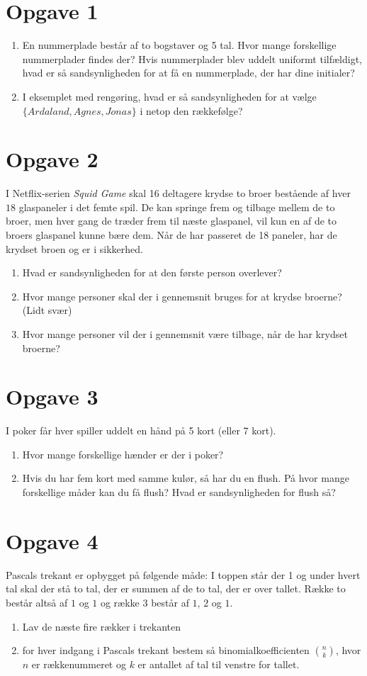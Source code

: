 \section*{Opgave 1}
\begin{enumerate}[label=\roman*)]
\item En nummerplade består af to bogstaver og 5 tal. Hvor mange forskellige nummerplader findes der? Hvis nummerplader blev uddelt uniformt tilfældigt, hvad er så sandsynligheden for at få en nummerplade, der har dine initialer?
\item I eksemplet med rengøring, hvad er så sandsynligheden for at vælge $\{Ardaland, Agnes,Jonas\}$ i netop den rækkefølge?
\end{enumerate}
\section*{Opgave 2}
I Netflix-serien \textit{Squid Game} skal 16 deltagere krydse to broer bestående af hver $18$ glaspaneler i det femte spil. De kan springe frem og tilbage mellem de to broer, men hver gang de træder frem til næste glaspanel, vil kun en af de to broers glaspanel kunne bære dem. Når de har passeret de 18 paneler, har de krydset broen og er i sikkerhed.
\begin{enumerate}[label=\roman*)]
\item Hvad er sandsynligheden for at den første person overlever?
\item Hvor mange personer skal der i gennemsnit bruges for at krydse broerne? (Lidt svær)
\item Hvor mange personer vil der i gennemsnit være tilbage, når de har krydset broerne?
\end{enumerate}
\section*{Opgave 3}
I poker får hver spiller uddelt en hånd på 5 kort (eller 7 kort). 
\begin{enumerate}[label=\roman*)]
\item Hvor mange forskellige hænder er der i poker?
\item Hvis du har fem kort med samme kulør, så har du en flush. På hvor mange forskellige måder kan du få flush? Hvad er sandsynligheden for flush så?
\end{enumerate}
\section*{Opgave 4}
Pascals trekant er opbygget på følgende måde: I toppen står der 1 og under hvert tal skal der stå to tal, der er summen af de to tal, der er over tallet. Række to består altså af $1$ og $1$ og række 3 består af $1$, $2$ og $1$.
\begin{enumerate}[label=\roman*)]
\item Lav de næste fire rækker i trekanten
\item for hver indgang i Pascals trekant bestem så binomialkoefficienten $\binom{n}{k}$, hvor $n$ er rækkenummeret og $k$ er antallet af tal til venstre for tallet.
\end{enumerate}